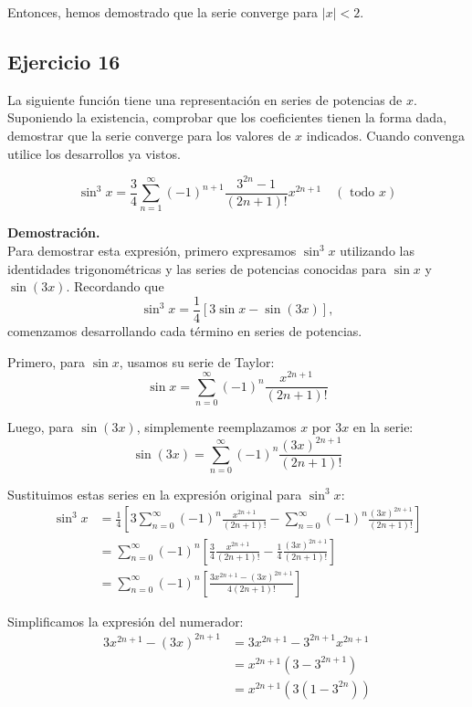 \documentclass{article}
\begin{document}
    Entonces, hemos demostrado que la serie converge para $|x| < 2$.

    \subsection*{Ejercicio 16}

    La siguiente función tiene una representación en series de potencias de \( x \). Suponiendo la existencia, comprobar que los coeficientes tienen la forma dada, demostrar que la serie converge para los valores de \( x \) indicados. Cuando convenga utilice los desarrollos ya vistos.

    $$
    \sin ^{3} x=\frac{3}{4} \sum_{n=1}^{\infty}(-1)^{n+1} \frac{3^{2 n}-1}{(2 n+1)!} x^{2 n+1} \quad(\text { todo } x)
    $$

    \textbf{Demostración.}\\

    Para demostrar esta expresión, primero expresamos \( \sin^3 x \) utilizando las identidades trigonométricas y las series de potencias conocidas para \( \sin x \) y \( \sin(3x) \).
    Recordando que
    \[
    \sin^3 x = \frac{1}{4} \left[ 3 \sin x - \sin(3x) \right],
    \]
    comenzamos desarrollando cada término en series de potencias.

    Primero, para \( \sin x \), usamos su serie de Taylor:
    \[
    \sin x = \sum_{n=0}^{\infty} (-1)^n \frac{x^{2n+1}}{(2n+1)!}
    \]

    Luego, para \( \sin(3x) \), simplemente reemplazamos \( x \) por \( 3x \) en la serie:
    \[
    \sin(3x) = \sum_{n=0}^{\infty} (-1)^n \frac{(3x)^{2n+1}}{(2n+1)!}
    \]

    Sustituimos estas series en la expresión original para \( \sin^3 x \):
    \begin{align*}
    \sin^3 x &= \frac{1}{4} \left[ 3 \sum_{n=0}^{\infty} (-1)^n \frac{x^{2n+1}}{(2n+1)!} - \sum_{n=0}^{\infty} (-1)^n \frac{(3x)^{2n+1}}{(2n+1)!} \right]\\
    &= \sum_{n=0}^{\infty} (-1)^n \left[\frac{3}{4} \frac{x^{2n+1}}{(2n+1)!} - \frac{1}{4} \frac{(3x)^{2n+1}}{(2n+1)!} \right] \\
    &= \sum_{n=0}^{\infty} (-1)^n \left[\frac{3 x^{2n+1} - (3 x)^{2n+1}}{4 (2n+1)!}\right]
    \end{align*}

    Simplificamos la expresión del numerador:
    \begin{align*}
    3 x^{2n+1} - (3 x)^{2n+1} &= 3 x^{2n+1} - 3^{2n+1} x^{2n+1} \\
    &= x^{2n+1} (3 - 3^{2n+1}) \\
    &= x^{2n+1} \left(3 (1 - 3^{2n})\right)
    \end{align*}
\end{document}
